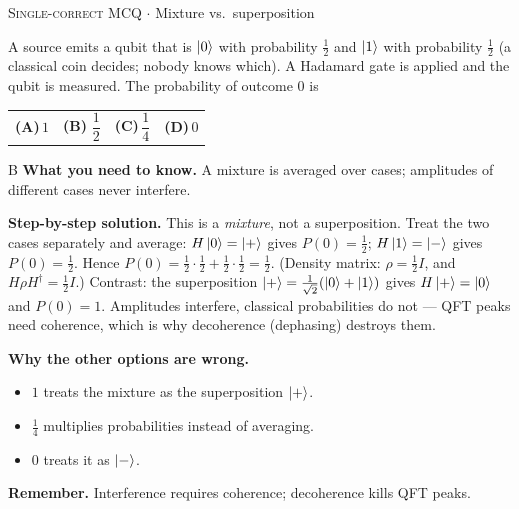 \documentclass[11pt,a4paper]{article}
\newcommand{\optlabel}[1]{\textbf{(#1)}}
\newcommand{\correctlabel}[1]{\textcolor{okgreen}{\textbf{(#1)}\,\ding{51}}}
\newenvironment{qitem}[1]{\begin{list}{}{\setlength{\leftmargin}{3.3em}\setlength{\labelwidth}{3.1em}%
  \setlength{\labelsep}{0.2em}\setlength{\topsep}{3pt}\setlength{\parsep}{3pt}}\item[\textbf{Q.#1}\hfill]}{\end{list}}
\newcommand{\qsep}{\par\vspace{2pt}{\color{black!15}\hrule}\vspace{4pt}}
\newcommand{\qmeta}[2]{{\footnotesize\color{black!60}\textsc{#1} \;$\cdot$\; #2}\par}
\begin{document}
\begin{qitem}{34}
\qmeta{Single-correct MCQ}{Mixture vs.\ superposition}
A source emits a qubit that is $\ket0$ with probability $\frac12$ and $\ket1$ with probability $\frac12$ (a classical
coin decides; nobody knows which). A Hadamard gate is applied and the qubit is measured. The probability of outcome $0$ is
\par\smallskip\noindent\begin{tabularx}{\linewidth}{@{}*{4}{L}@{}}
\optlabel{A}\,$1$ & \correctlabel{B}\,$\dfrac12$ & \optlabel{C}\,$\dfrac14$ & \optlabel{D}\,$0$
\end{tabularx}
\end{qitem}
\begin{solbox}{B}
\textbf{\color{brand}What you need to know.} A mixture is averaged over cases; amplitudes of different cases never interfere.

\textbf{\color{brand}Step-by-step solution.} This is a \emph{mixture}, not a superposition. Treat the two cases separately and average:
$H\ket0 = \ket{+}$ gives $P(0) = \frac12$; $H\ket1 = \ket{-}$ gives $P(0) = \frac12$. Hence $P(0) = \frac12\cdot\frac12 + \frac12\cdot\frac12 = \frac12$.
(Density matrix: $\rho = \frac12 I$, and $H\rho H^\dagger = \frac12 I$.) Contrast: the superposition
$\ket{+} = \frac{1}{\sqrt2}(\ket0 + \ket1)$ gives $H\ket{+} = \ket0$ and $P(0) = 1$. Amplitudes interfere, classical probabilities do
not --- QFT peaks need coherence, which is why decoherence (dephasing) destroys them.

\textbf{\color{brand}Why the other options are wrong.}
\begin{itemize}[leftmargin=2.4em, itemsep=1pt, topsep=2pt]
\item[\textbf{(A)}] $1$ treats the mixture as the superposition $\ket+$.
\item[\textbf{(C)}] $\frac14$ multiplies probabilities instead of averaging.
\item[\textbf{(D)}] $0$ treats it as $\ket-$.
\end{itemize}
\textbf{\color{brand}Remember.} Interference requires coherence; decoherence kills QFT peaks.
\end{solbox}
\qsep
\end{document}
